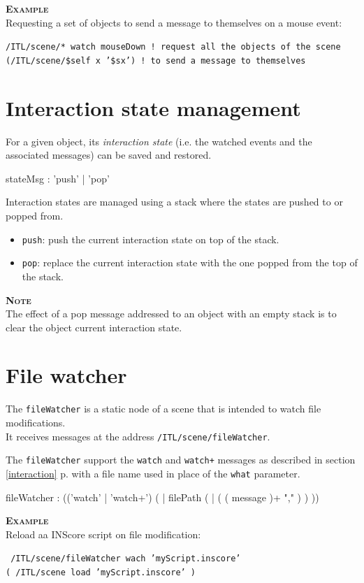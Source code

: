 \documentclass[a4paper,twoside]{report}
\newcommand{\sublevel}[1]	{\section{#1}}
\newcommand{\fullref}[1]	{\ref{#1} p.\pageref{#1}}
\newcommand{\OSC}[1]		{\texttt{#1}}
\newcommand{\example}		{\textbf{\hspace{-1.5cm}\textbf{\textsc{Example }}}}
\newcommand{\note}	[1]		{\vspace{2mm}\textbf{\hspace{-1.03cm}\textbf{\textsc{Note #1}}}}
\newcommand{\sample}	[1]			{\vspace{-2mm}\begin{center}\colorbox{mygrey}{
								\begin{minipage}[t]{0.9\columnwidth} 
								{\small \texttt{#1}}
								\end{minipage}}\end{center}}
\begin{document}
\example \\
Requesting a set of objects to send a message to themselves on a mouse event:
\sample{/ITL/scene/* watch mouseDown \hspace*{2.4cm}! request all the objects of the scene \\
\hspace*{2.7cm}(/ITL/scene/\$self x '\$sx') ! to send a message to themselves
}

\sublevel{Interaction state management}
\label{evtstate}

For a given object, its \emph{interaction state} (i.e. the watched events and the associated messages) can be saved and restored.
\begin{rail} 
stateMsg : 'push' | 'pop'
\end{rail}

Interaction states are managed using a stack where the states are pushed to or popped from.
\begin{itemize}
\item \OSC{push}: push the current interaction state on top of the stack.
\item \OSC{pop}: replace the current interaction state with the one popped from the top of the stack.
\end{itemize}

\note{} \\
The effect of a pop message addressed to an object with an empty stack is to clear the object current interaction state.


\sublevel{File watcher}
\label{filewatch}

The \OSC{fileWatcher} is a static node of a scene that is intended to watch file modifications. \\
It receives messages at the address \OSC{/ITL/scene/fileWatcher}.

The \OSC{fileWatcher} support the \OSC{watch} and \OSC{watch+} messages as described in section \fullref{interaction} with a file name used in place of the \OSC{what} parameter.

\begin{rail}
fileWatcher : (('watch' | 'watch+')  ( | filePath  ( |  ( ( message  )+ "," ) )  )) 
\end{rail}

\example \\
Reload aa INScore script on file modification:
\sample{
/ITL/scene/fileWatcher wach 'myScript.inscore' \\
\hspace*{3cm}( /ITL/scene load 'myScript.inscore' )
}
\end{document}
